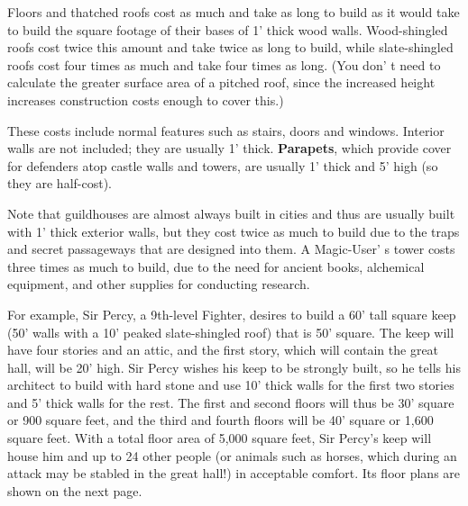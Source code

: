 \documentclass[a4paper,twoside,openany,10pt]{book}
\begin{document}
\begin{multicols}{2}
Floors and thatched roofs cost as much and take as long to build as it would take to build the square footage of their bases of 1' thick wood walls. Wood-shingled roofs cost twice this amount and take twice as long to build, while slate-shingled roofs cost four times as much and take four times as long. (You don' t need to calculate the greater surface area of a pitched roof, since the increased height increases construction costs enough to cover this.)

These costs include normal features such as stairs, doors and windows. Interior walls are not included; they are usually 1' thick. \textbf{Parapets}, which provide cover for defenders atop castle walls and towers, are usually 1' thick and 5' high (so they are half-cost).

Note that guildhouses are almost always built in cities and thus are usually built with 1' thick exterior walls, but they cost twice as much to build due to the traps and secret passageways that are designed into them. A Magic-User' s tower costs three times as much to build, due to the need for ancient books, alchemical equipment, and other supplies for conducting research.

For example, Sir Percy, a 9th-level Fighter, desires to build a 60' tall square keep (50' walls with a 10' peaked slate-shingled roof) that is 50' square. The keep will have four stories and an attic, and the first story, which will contain the great hall, will be 20' high. Sir Percy wishes his keep to be strongly built, so he tells his architect to build with hard stone and use 10' thick walls for the first two stories and 5' thick walls for the rest. The first and second floors will thus be 30' square or 900 square feet, and the third and fourth floors will be 40' square or 1,600 square feet. With a total floor area of 5,000 square feet, Sir Percy's keep will house him and up to 24 other people (or animals such as horses, which during an attack may be stabled in the great hall!) in acceptable comfort. Its floor plans are shown on the next page.


\end{multicols}
\end{document}
